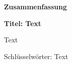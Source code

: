 \thispagestyle{empty}

\begin{de}
	\begin{center}
		\textbf{Zusammenfassung}
	\end{center}
	\textbf{Titel: Text}
	
	Text
	
	Schlüsselwörter: Text
\end{de}